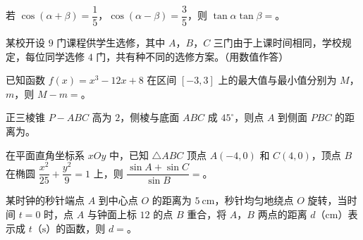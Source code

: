 \begin{question}
若 $\cos(\alpha+\beta)=\dfrac15$，$\cos(\alpha-\beta)=\dfrac35$，则 $\tan\alpha\tan\beta=$\gkblank{}。

\end{question}
\begin{question}
某校开设 $9$ 门课程供学生选修，其中 $A$，$B$，$C$ 三门由于上课时间相同，学校规定，每位同学选修 $4$ 门，共有\gkblank{}种不同的选修方案。（用数值作答）

\end{question}
\begin{question}
已知函数 $f(x)=x^3-12x+8$ 在区间 $[-3,3]$ 上的最大值与最小值分别为 $M$，$m$，则 $M-m=$\gkblank{}。

\end{question}
\begin{question}
正三棱锥 $P-ABC$ 高为 $2$，侧棱与底面 $ABC$ 成 $45^\circ$，则点 $A$ 到侧面 $PBC$ 的距离为\gkblank{}。

\end{question}
\begin{question}
在平面直角坐标系 $xOy$ 中，已知 $\triangle ABC$ 顶点 $A(-4,0)$ 和 $C(4,0)$，顶点 $B$ 在椭圆 $\dfrac{x^2}{25}+\dfrac{y^2}{9}=1$ 上，则 $\dfrac{\sin A+\sin C}{\sin B}=$\gkblank{}。

\end{question}
\begin{question}
某时钟的秒针端点 $A$ 到中心点 $O$ 的距离为 $5\ \mathrm{cm}$，秒针均匀地绕点 $O$ 旋转，当时间 $t=0$ 时，点 $A$ 与钟面上标 $12$ 的点 $B$ 重合，将 $A$，$B$ 两点的距离 $d$（$\mathrm{cm}$）表示成 $t$（$\mathrm{s}$）的函数，则 $d=$\gkblank{}。

\end{question}

